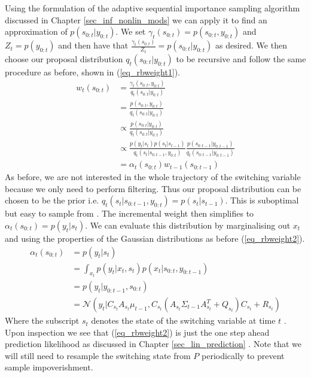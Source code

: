 Using the formulation of the adaptive sequential importance sampling algorithm discussed in Chapter \ref{sec_inf_nonlin_mods} we can apply it to find an approximation of $p(s_{0:t}|y_{0:t})$. We set $\gamma_t(s_{0:t})=p(s_{0:t},y_{0:t})$ and $Z_t=p(y_{0:t})$ and then have that $\frac{\gamma_t(s_{0:t})}{Z_t} = p(s_{0:t}|y_{0:t})$ as desired. We then choose our proposal distribution $q_t(s_{0:t}|y_{0:t})$ to be recursive and follow the same procedure as before, shown in (\ref{eq_rbweight1}).
\begin{equation}
\begin{aligned}
w_t(s_{0:t}) &= \frac{\gamma_t(s_{0:t},y_{0:t})}{q_t(s_{0:t}|y_{0:t})} \\
&= \frac{p(s_{0:t},y_{0:t})}{q_t(s_{0:t}|y_{0:t})} \\
&\propto \frac{p(s_{0:t}|y_{0:t})}{q_t(s_{0:t}|y_{0:t})} \\
&\propto \frac{p(y_t|s_t)p(s_t|s_{t-1})}{q_t(s_t|s_{0:t-1},y_{0:t})}\frac{p(s_{0:t-1}|y_{0:t-1})}{q_t(s_{0:t-1}|y_{0:t-1})} \\
&= \alpha_t(s_{0:t})w_{t-1}(s_{0:t-1})
\end{aligned}
\label{eq_rbweight1}
\end{equation}
As before, we are not interested in the whole trajectory of the switching variable because we only need to perform filtering. Thus our proposal distribution can be chosen to be the prior i.e. $q_t(s_t|s_{0:t-1},y_{0:t}) = p(s_t|s_{t-1})$. This is suboptimal but easy to sample from \cite{doucet}. The incremental weight then simplifies to $\alpha_t(s_{0:t}) = p(y_t|s_t)$. We can evaluate this distribution by marginalising out $x_t$ and using the properties of the Gaussian distributions as before (\ref{eq_rbweight2}).
\begin{equation}
\begin{aligned}
\alpha_t(s_{0:t}) &= p(y_t|s_t) \\
&= \int_{x_t} p(y_t|x_t,s_t)p(x_t|s_{0:t},y_{0:t-1}) \\
&= p(y_t|y_{0:t-1}, s_{0:t}) \\
&= \mathcal{N}\left(y_t | C_{s_t}A_{s_t}\mu_{t-1}, C_{s_t}\left(A_{s_t}\Sigma_{t-1}A_{s_t}^T+Q_{s_t} \right)C_{s_t} + R_{s_t} \right)
\end{aligned}
\label{eq_rbweight2}
\end{equation} 
Where the subscript $s_t$ denotes the state of the switching variable at time $t$ \cite{murphy1}. Upon inspection we see that (\ref{eq_rbweight2}) is just the one step ahead prediction likelihood as discussed in Chapter \ref{sec_lin_prediction} \cite{murphy1}. Note that we will still need to resample the switching state from $P$ periodically to prevent sample impoverishment. 

